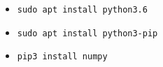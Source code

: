 

\begin{itemize}
\item \verb|sudo apt install python3.6|
\item \verb|sudo apt install python3-pip|
\item \verb|pip3 install numpy|
\end{itemize}
